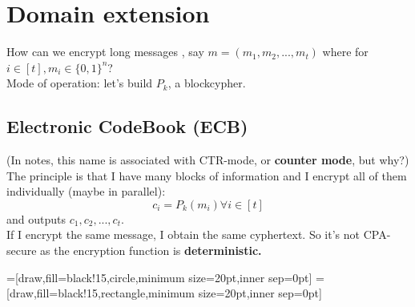\section{Domain extension}

How can we encrypt long messages , say $m=(m_{1}, m_{2}, ..., m_{t})$ where
for $i \in [t], m_{i} \in \{0,1\}^{n} $?\\

Mode of operation: let's build $P_{k}$, a blockcypher.\\

\subsection{Electronic CodeBook (ECB)}

(In notes, this name is associated with CTR-mode, or \textbf{counter mode}, but
why?)\\
The principle is that I have many blocks of information and I encrypt all of
them individually (maybe in parallel):
\[
    c_{i}=P_{k}(m_{i}) \forall i \in [t]
\]
and outputs $c_{1}, c_{2}, ..., c_{t}$.\\

If I encrypt the same message, I obtain the same cyphertext. So it's not
CPA-secure as the encryption function is \textbf{deterministic.}

\begin{preview}
    =[draw,fill=black!15,circle,minimum size=20pt,inner sep=0pt]
    =[draw,fill=black!15,rectangle,minimum size=20pt,inner sep=0pt]
    \centering
\end{preview}

